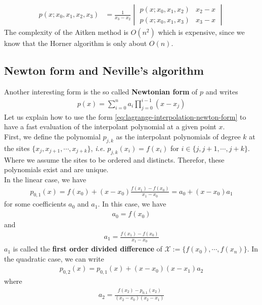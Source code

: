 \begin{align*}
  p(x; x_0, x_1, x_2, x_3) &= \frac{1}{x_3-x_2} \begin{vmatrix}p(x; x_0, x_1, x_2) & x_2 - x \\ p(x; x_0, x_1, x_3) & x_3 - x \end{vmatrix}
\end{align*}
The complexity of the Aitken method is $O(n^2)$ which is expensive, since we know that the Horner algorithm is only about $O(n)$.

\subsection{Newton form and Neville's algorithm}
\noindent
Another interesting form is the so called \textbf{Newtonian form} of $p$ and writes
\begin{align}
  p(x) = \sum\limits_{i=0}^n a_i \prod\limits_{j=0}^{i-1}\left( x - x_j \right)    
  \label{eq:lagrange-interpolation-newton-form}
\end{align}
Let us explain how to use the form \ref{eq:lagrange-interpolation-newton-form} to have a fast evaluation of the interpolant polynomial at a given point $x$.
\\
\noindent
First, we define the polynomial $p_{j,k}$ as the interpolant polynomials of degree $k$ at the sites $\{ x_j, x_{j+1}, \cdots, x_{j+k} \}$, \textit{i.e.} $p_{j,k}(x_i) = f(x_i)$ for $i \in \{ j, j+1, \cdots, j+k \}$. Where we assume the sites to be ordered and distincts. Therefor, these polynomials exist and are unique.
\\
\noindent
In the linear case, we have
\begin{align}
  p_{0,1} (x) = f(x_0) + (x-x_0) \frac{f(x_1) - f(x_0)}{x_1-x_0} = a_0 + (x-x_0)a_1
\end{align}
for some coefficients $a_0$ and $a_1$. In this case, we have 
\begin{align}
  a_0 =  f(x_0)
\end{align}
and
\begin{align}
  a_1 =  \frac{f(x_1) - f(x_0)}{x_1-x_0}  
\end{align}
$a_1$ is called the \textbf{first order divided difference} of $\mathcal{X} := \{ f(x_0), \cdots,  f(x_{n}) \}$.
In the quadratic case, we can write
\begin{align}
  p_{0,2}(x) = p_{0,1}(x) + (x-x_0)(x-x_1)a_2  
\end{align}
where
\begin{align}
  a_2 =  \frac{f(x_2) - p_{0,1}(x_2)}{(x_2-x_0)(x_2-x_1)}  
\end{align}
